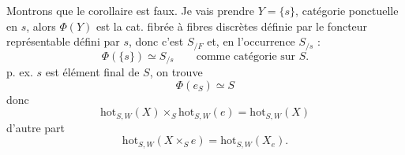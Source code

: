 
Montrons que le corollaire est faux. Je vais prendre $Y=\{s\}$, catégorie ponctuelle en $s$,  alors $\Phi(Y)$ est la cat. fibrée à fibres discrètes définie par le foncteur représentable  défini par $s$, donc c'est $S_{/F}$ et, en l'occurrence $S_{/s}$ :
\[
 \Phi(\{s\})\simeq S_{/s}\qquad\text{comme catégorie sur }S.
\]
 p. ex. $s$ est élément final  de $S$, on trouve
\[
 \Phi(e_S)\simeq S
\]
donc
\[
 \mathrm{hot}_{S,W}(X)\times_S\mathrm{hot}_{S,W}(e)=\mathrm{hot}_{S,W}(X)
\]
d'autre part
\[
 \mathrm{hot}_{S,W}(X\times_S e)=\mathrm{hot}_{S,W}(X_e).
\]

